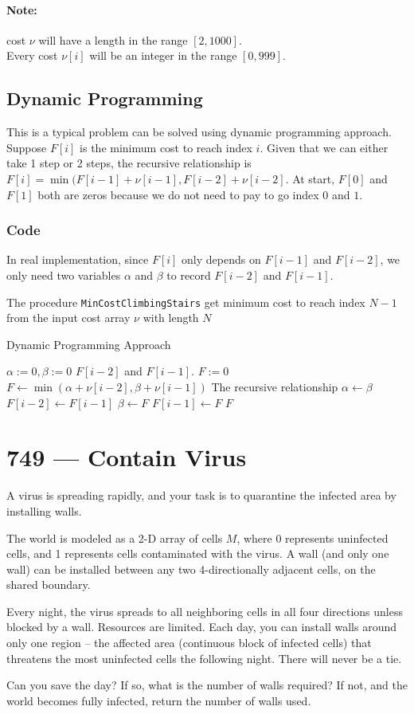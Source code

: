 \paragraph{Note:}
cost $\nu$ will have a length in the range $[2, 1000]$.
\\
Every cost $\nu[i]$ will be an integer in the range $[0, 999]$.
\subsection{Dynamic Programming}
This is a typical problem can be solved using dynamic programming approach. Suppose $F[i]$ is the minimum cost to reach index $i$. Given that we can either take 1 step or 2 steps, the recursive relationship is $F[i] = \min(F[i-1]+\nu[i-1], F[i-2]+\nu[i-2]$. At start, $F[0]$ and $F[1]$ both are zeros because we do not need to pay to go index $0$ and $1$.
\subsubsection{Code}
In real implementation, since $F[i]$ only depends on $F[i-1]$ and $F[i-2]$, we only need two variables $\alpha$ and $\beta$ to record $F[i-2]$ and $F[i-1]$.
\par
The procedure \texttt{MinCostClimbingStairs} get minimum cost to reach index $N-1$ from the input cost array $\nu$ with length $N$
\setcounter{algorithm}{0}
\begin{algorithm}[H]
\caption{Dynamic Programming Approach}
\begin{algorithmic}[1]
\State $\alpha:=0,\beta:=0$ \Comment $F[i-2]$ and $F[i-1]$.
\State $F:=0$
\State $F\gets \min(\alpha + \nu[i-2], \beta + \nu[i-1])$ \Comment The recursive relationship
\State $\alpha\gets \beta$ \Comment $F[i-2]\gets F[i-1]$
\State $\beta\gets F$ \Comment $F[i-1]\gets F$
\EndFor
\State \Return $F$
\EndProcedure
\end{algorithmic}
\end{algorithm}

\section{749 --- Contain Virus}
A virus is spreading rapidly, and your task is to quarantine the infected area by installing walls.
\par
The world is modeled as a 2-D array of cells $M$, where 0 represents uninfected cells, and 1 represents cells contaminated with the virus. A wall (and only one wall) can be installed between any two 4-directionally adjacent cells, on the shared boundary.
\par
Every night, the virus spreads to all neighboring cells in all four directions unless blocked by a wall. Resources are limited. Each day, you can install walls around only one region -- the affected area (continuous block of infected cells) that threatens the most uninfected cells the following night. There will never be a tie.
\par
Can you save the day? If so, what is the number of walls required? If not, and the world becomes fully infected, return the number of walls used.
